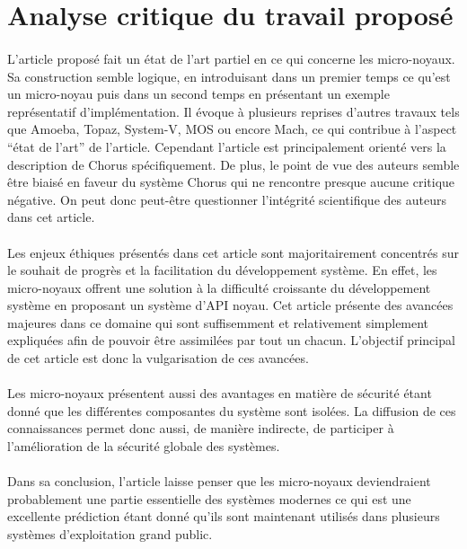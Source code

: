 \documentclass[a4paper, 12pt]{article}
\begin{document}
\clearpage 
\section{Analyse critique du travail proposé}
\paragraph{}
L'article proposé fait un état de l'art partiel en ce qui concerne les micro-noyaux. Sa construction semble logique, en introduisant dans un premier temps ce qu'est un micro-noyau puis dans un second temps en présentant un exemple représentatif d'implémentation. Il évoque à plusieurs reprises d'autres travaux tels que Amoeba, Topaz, System-V, MOS ou encore  Mach, ce qui contribue à l'aspect ``état de l'art'' de l'article. Cependant l'article est principalement orienté vers la description de Chorus spécifiquement. De plus, le point de vue des auteurs semble être biaisé en faveur du système Chorus qui ne rencontre presque aucune critique négative. On peut donc peut-être questionner l'intégrité scientifique des auteurs dans cet article.
\paragraph{}
Les enjeux éthiques présentés dans cet article sont majoritairement concentrés sur le souhait de progrès et la facilitation du développement système. En effet, les micro-noyaux offrent une solution à la difficulté croissante du développement système en proposant un système d'API noyau. Cet article présente des avancées majeures dans ce domaine qui sont suffisemment et relativement simplement expliquées afin de pouvoir être assimilées par tout un chacun. L'objectif principal de cet article est donc la vulgarisation de ces avancées. \paragraph{}
Les micro-noyaux présentent aussi des avantages en matière de sécurité étant donné que les différentes composantes du système sont isolées. La diffusion de ces connaissances permet donc aussi, de manière indirecte, de participer à l'amélioration de la sécurité globale des systèmes.
\paragraph{}
Dans sa conclusion, l'article laisse penser que les micro-noyaux deviendraient probablement une partie essentielle des systèmes modernes ce qui est une excellente prédiction étant donné qu'ils sont maintenant utilisés dans plusieurs systèmes d'exploitation grand public.
\end{document}

